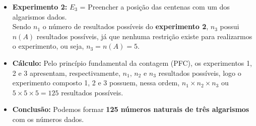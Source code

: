 \documentclass[a4paper,12pt]{article}
\begin{document}
\begin{enumerate}
\begin{itemize}
    \item[\ding{176}] \textbf{Experimento 2:} $E_3$ = Preencher a posição das centenas com um dos algarismos dados.\\ Sendo $n_{1}$ o número de resultados possíveis do \textbf{experimento 2}, $n_{3}$ possui $n(A)$ resultados possíveis, já que nenhuma restrição existe para realizarmos o experimento, ou seja, $n_{3} = n(A) = 5$.
    
    \item[\ding{177}] \textbf{Cálculo:} Pelo princípio fundamental da contagem (PFC), os experimentos 1, 2 e 3 apresentam, respectivamente, $n_{1},\, n_{2} \textrm{ e } n_{3}$ resultados possíveis, logo o experimento composto 1, 2 e 3 possuem, nessa ordem, $n_{1} \times n_{2} \times n_{3}$ ou $5 \times 5 \times 5 = 125$ resultados possíveis.
    \item[\ding{178}] \textbf{Conclusão:} Podemos formar \textbf{125 números naturais de três algarismos} com os números dados.
 \end{itemize}
  

\end{enumerate}
\end{document}
